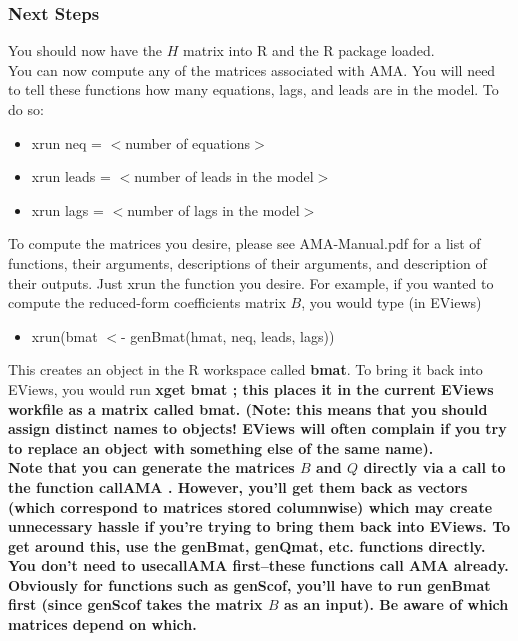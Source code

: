 \documentclass[12pt]{article}
\begin{document}
\subsubsection{Next Steps}
You should now have the $H$ matrix into R and the R package loaded. \\

You can now compute any of the matrices associated with AMA.  You will need to tell these functions how many equations, lags, and leads are in the model.  To do so: \begin{itemize}
\item xrun neq = $<$number of equations$>$
\item xrun leads = $<$number of leads in the model$>$
\item xrun lags = $<$number of lags in the model$>$
\end{itemize}
To compute the matrices you desire, please see AMA-Manual.pdf for a list of functions, their arguments, descriptions of their arguments, and description of their outputs.  Just xrun the function you desire.  For example, if you wanted to compute the reduced-form coefficients matrix $B$, you would type (in EViews) \begin{itemize}
\item xrun(bmat $<$- genBmat(hmat, neq, leads, lags))
\end{itemize}
This creates an object in the R workspace called {\bfseries bmat}.  To bring it back into EViews, you would run \bfseries xget bmat \normalfont; this places it in the current EViews workfile as a matrix called {\bfseries bmat}. (Note: this means that you should assign distinct names to objects! EViews will often complain if you try to replace an object with something else of the same name). \\

Note that you can generate the matrices $B$ and $Q$ directly via a call to the function \bfseries callAMA \normalfont.  However, you'll get them back as vectors (which correspond to matrices stored columnwise) which may create unnecessary hassle if you're trying to bring them back into EViews.  To get around this, use the \bfseries genBmat, genQmat\normalfont, etc. functions directly.  You don't need to use\bfseries callAMA \normalfont first--these functions call AMA already.  \\
Obviously for functions such as {\bfseries genScof}, you'll have to run {\bfseries genBmat} first (since {\bfseries genScof} takes the matrix $B$ as an input).  Be aware of which matrices depend on which. \\
\end{document}
